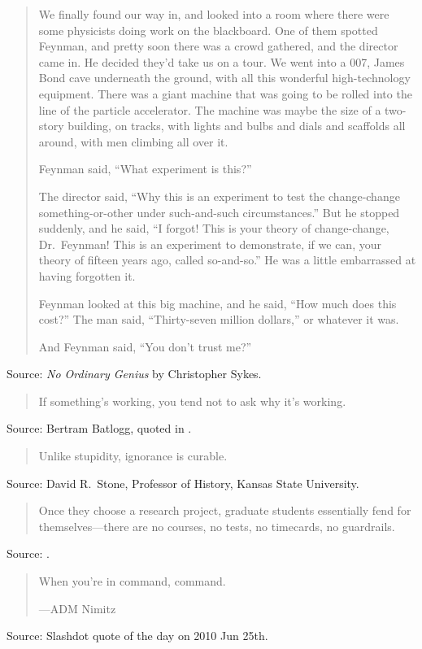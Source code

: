 \documentclass[a4paper]{article}
\begin{document}
\begin{quote}
	We finally found our way in, and looked into a room where there
	were some physicists doing work on the blackboard. One of them
	spotted Feynman, and pretty soon there was a crowd gathered,
	and the director came in. He decided they'd take us on a
	tour. We went into a 007, James Bond cave underneath the ground,
	with all this wonderful high-technology equipment. There was
	a giant machine that was going to be rolled into the line of
	the particle accelerator. The machine was maybe the size of a
	two-story building, on tracks, with lights and bulbs and dials
	and scaffolds all around, with men climbing all over it.

	Feynman said, ``What experiment is this?''

	The director said, ``Why this is an experiment to test the
	change-change something-or-other under such-and-such
	circumstances.''  But he stopped suddenly, and he said, ``I forgot!
	This is your theory of change-change, Dr.~Feynman!  This is
	an experiment to demonstrate, if we can, your theory of fifteen
	years ago, called so-and-so.''  He was a little embarrassed at
	having forgotten it.

	Feynman looked at this big machine, and he said, ``How much
	does this cost?''  The man said, ``Thirty-seven million dollars,''
	or whatever it was.

	And Feynman said, ``You don't trust me?''
\end{quote}
Source: \emph{No Ordinary Genius} by Christopher Sykes.
\medskip

\begin{quote}
	If something's working, you tend not to ask why it's working.
\end{quote}
Source: Bertram Batlogg, quoted in \citet[chapter 4, p.~79]{Reich2009}.
\medskip

\begin{quote}
	Unlike stupidity, ignorance is curable.
\end{quote}
Source: David R.~Stone, Professor of History, Kansas State University.
\medskip

\begin{quote}
	Once they choose a research project, graduate students
	essentially fend for themselves---there are no courses,
	no tests, no timecards, no guardrails.
\end{quote}
Source: \citet{Hall1998}.
\medskip

\begin{quote}
	When you're in command, command.

	---ADM Nimitz
\end{quote}
Source: Slashdot quote of the day on 2010 Jun 25th.
\medskip
\end{document}
